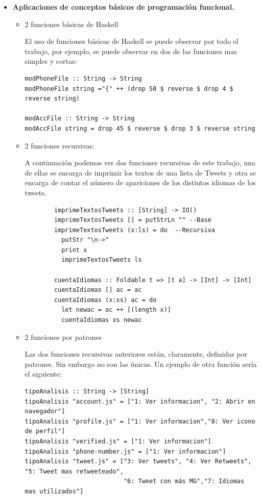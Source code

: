 \documentclass[11pt]{article}
\begin{document}
\begin{itemize}
    \item \textbf{Aplicaciones de conceptos básicos de programación funcional.}
    \begin{itemize}
        \item 2 funciones básicas de Haskell
        
        El uso de funciones básicas de Haskell se puede observar por todo el trabajo, por ejemplo, se puede observar en dos de las funciones mas simples y cortas:
        \medskip
        \begin{verbatim}
modPhoneFile :: String -> String
modPhoneFile string ="{" ++ (drop 50 $ reverse $ drop 4 $ reverse string)

modAccFile :: String -> String
modAccFile string = drop 45 $ reverse $ drop 3 $ reverse string
        \end{verbatim}
        \medskip
        
        \item 2 funciones recursivas:
        
        A continuación podemos ver dos funciones recursivas de este trabajo, una de ellas se encarga de imprimir los textos de una lista de Tweets y otra se encarga de contar el número de apariciones de los distintos idiomas de los tweets.
        
        \begin{verbatim}
        imprimeTextosTweets :: [String] -> IO()
        imprimeTextosTweets [] = putStrLn "" --Base
        imprimeTextosTweets (x:ls) = do  --Recursiva
          putStr "\n->"
          print x
          imprimeTextosTweets ls
          
        cuentaIdiomas :: Foldable t => [t a] -> [Int] -> [Int]
        cuentaIdiomas [] ac = ac
        cuentaIdiomas (x:xs) ac = do
          let newac = ac ++ [(length x)]
          cuentaIdiomas xs newac
            \end{verbatim}
        \medskip
        \item 2 funciones por patrones
        
        Las dos funciones recursivas anteriores están, claramente, definidas por patrones. Sin embargo no son las únicas. Un ejemplo de otra función sería el siguiente:
        \begin{verbatim}
tipoAnalisis :: String -> [String]
tipoAnalisis "account.js" = ["1: Ver informacion", "2: Abrir en navegador"]
tipoAnalisis "profile.js" = ["1: Ver informacion","8: Ver icono de perfil"]
tipoAnalisis "verified.js" = ["1: Ver informacion"]
tipoAnalisis "phone-number.js" = ["1: Ver informacion"]
tipoAnalisis "tweet.js" = ["3: Ver tweets", "4: Ver Retweets", "5: Tweet mas retweeteado",
                           "6: Tweet con más MG","7: Idiomas mas utilizados"]
            \end{verbatim}


\end{itemize}
\end{itemize}
\end{document}
